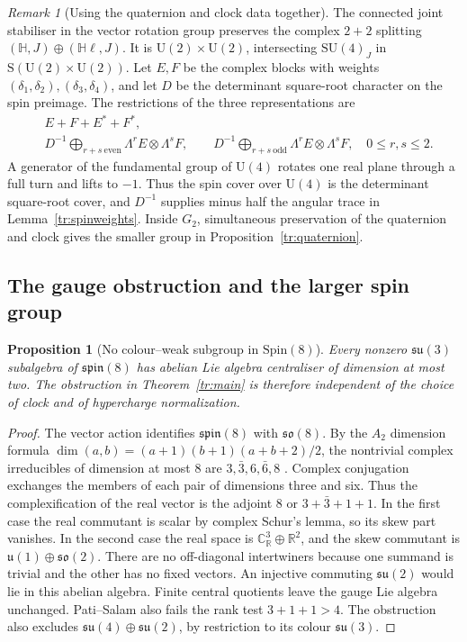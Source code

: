 \documentclass[aps,pra,onecolumn,superscriptaddress,nofootinbib,10pt]{revtex4-2}
\newtheorem{proposition}[theorem]{Proposition}
\theoremstyle{definition}
\theoremstyle{remark}
\newtheorem{remark}[theorem]{Remark}
\newcommand{\SU}{\mathrm{SU}}
\newcommand{\U}{\mathrm{U}}
\begin{document}
\begin{remark}[Using the quaternion and clock data together]\label{tr:joint}
The connected joint stabiliser in the vector rotation group
preserves the complex \(2+2\) splitting
\((\mathbb H,J)\oplus(\mathbb H\ell,J)\). It is
\(\U(2)\times\U(2)\), intersecting
\(\SU(4)_J\) in \(\mathrm S(\U(2)\times\U(2))\).
Let \(E,F\) be the complex blocks with weights
\((\delta_1,\delta_2),(\delta_3,\delta_4)\), and let \(D\) be
the determinant square-root character on the spin preimage.
The restrictions of the three representations are
\[
\begin{split}
 &E+F+E^*+F^*,\\
 &D^{-1}\!\!\bigoplus_{r+s\ \mathrm{even}}\!\Lambda^rE\otimes\Lambda^sF,
 \qquad
 D^{-1}\!\!\bigoplus_{r+s\ \mathrm{odd}}\!\Lambda^rE\otimes\Lambda^sF,
 \quad 0\leq r,s\leq2 .
\end{split}
\]
A generator of the fundamental group of \(\U(4)\)
rotates one real plane through a full turn and lifts to \(-1\).
Thus the spin cover over \(\U(4)\) is the determinant
square-root cover, and \(D^{-1}\) supplies minus half the angular
trace in Lemma~\ref{tr:spinweights}.
Inside \(G_2\), simultaneous preservation of the quaternion
and clock gives the smaller group in
Proposition~\ref{tr:quaternion}.
\end{remark}

\subsection{The gauge obstruction and the larger spin group}\label{tr:gauge}

\begin{proposition}[No colour--weak subgroup in \(\mathrm{Spin}(8)\)]\label{tr:obstruction}
Every nonzero \(\mathfrak{su}(3)\) subalgebra of
\(\mathfrak{spin}(8)\) has abelian Lie algebra centraliser of dimension at
most two. The obstruction in Theorem~\ref{tr:main} is therefore
independent of the choice of clock and of hypercharge normalization.
\end{proposition}
\begin{proof}
The vector action identifies \(\mathfrak{spin}(8)\) with
\(\mathfrak{so}(8)\). By the \(A_2\) dimension formula
\(\dim(a,b)=(a+1)(b+1)(a+b+2)/2\), the nontrivial complex
irreducibles of dimension at most \(8\) are \(3,\bar3,6,\bar6,8\)
\cite[\S24]{tr:Humphreys}. Complex conjugation exchanges the
members of each pair of dimensions three and six.
Thus the complexification of the real vector is the adjoint
\(8\) or \(3+\bar3+1+1\).
In the first case the real commutant is scalar by complex
Schur's lemma, so its skew part vanishes.
In the second case the real space is
\(\mathbb C^3_{\mathbb R}\oplus\mathbb R^2\), and the skew
commutant is \(\mathfrak u(1)\oplus\mathfrak{so}(2)\).
There are no off-diagonal intertwiners because one summand is
trivial and the other has no fixed vectors.
An injective commuting \(\mathfrak{su}(2)\) would lie in
this abelian algebra. Finite central quotients leave the
gauge Lie algebra unchanged. Pati--Salam also fails the
rank test \(3+1+1>4\).
The obstruction also excludes \(\mathfrak{su}(4)\oplus
\mathfrak{su}(2)\), by restriction to its colour
\(\mathfrak{su}(3)\).
\end{proof}
\end{document}
